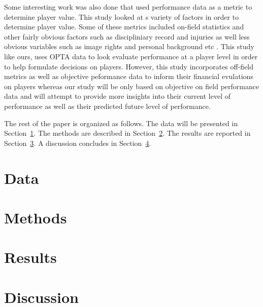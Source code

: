 \documentclass[12pt]{article}
\begin{document}
Some interesting work was also done that used performance data as a metric to 
determine player value. This study looked at s variety of factors in order to 
determine player value. Some of these metrics included on-field statistics and
other fairly obvious factors such as discipliniary record and injuries as well
less obvious variables such as image rights and personal background etc 
\citep{tunaru2010valuations}. This study like ours, uses OPTA data to look
evaluate performance at a player level in order to help formulate decisions on
players. However, this study incorporates off-field metrics as well as  objective
peformance data to inform their financial evulations on players whereas our
study will be only based on objective on field performance data and will attempt
to provide more insights into their current level of performance as well as
their predicted future level of performance.

The rest of the paper is organized as follows.
The data will be presented in Section~\ref{sec:data}.
The methods are described in Section~\ref{sec:meth}.
The results are reported in Section~\ref{sec:resu}.
A discussion concludes in Section~\ref{sec:disc}.


\section{Data}
\label{sec:data}





\section{Methods}
\label{sec:meth}







\section{Results}
\label{sec:resu}


\section{Discussion}
\label{sec:disc}












 
\end{document}
